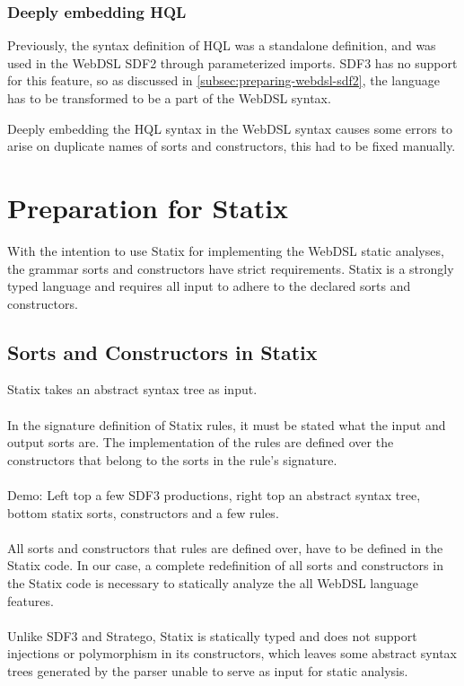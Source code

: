       \subsubsection{Deeply embedding HQL}

        Previously, the syntax definition of HQL was a standalone definition, and was used in the WebDSL SDF2 through parameterized imports. SDF3 has no support for this feature, so as discussed in \cref{subsec:preparing-webdsl-sdf2}, the language has to be transformed to be a part of the WebDSL syntax.
        
        Deeply embedding the HQL syntax in the WebDSL syntax causes some errors to arise on duplicate names of sorts and constructors, this had to be fixed manually.

  \section{\label{sec:preparation-for-statix}Preparation for Statix}

    With the intention to use Statix for implementing the WebDSL static analyses, the grammar sorts and constructors have strict requirements. Statix is a strongly typed language and requires all input to adhere to the declared sorts and constructors.

    \subsection{\label{subsec:sorts-in-statix}Sorts and Constructors in Statix}

      Statix takes an abstract syntax tree as input.
      \\\\In the signature definition of Statix rules, it must be stated what the input and output sorts are. The implementation of the rules are defined over the constructors that belong to the sorts in the rule's signature.
      \\\\Demo: Left top a few SDF3 productions, right top an abstract syntax tree, bottom statix sorts, constructors and a few rules.
      \\\\All sorts and constructors that rules are defined over, have to be defined in the Statix code. In our case, a complete redefinition of all sorts and constructors in the Statix code is necessary to statically analyze the all WebDSL language features.
      \\\\Unlike SDF3 and Stratego, Statix is statically typed and does not support injections or polymorphism in its constructors, which leaves some abstract syntax trees generated by the parser unable to serve as input for static analysis.

